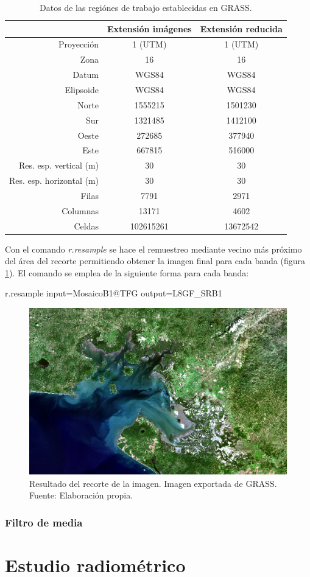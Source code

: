 \begin{table}[ht]
	\centering
	\caption[Datos de las regiónes de trabajo]{Datos de las regiónes de trabajo establecidas en GRASS.}
	\begin{tabular}{|r|c|c|}
	\hline
	& Extensión imágenes & Extensión reducida\\
	\hline
	Proyección & 1 (UTM) & 1 (UTM) \\
	\hline
	Zona & 16 & 16 \\
	\hline
	Datum & WGS84 & WGS84 \\
	\hline
	Elipsoide & WGS84 & WGS84 \\
	\hline
	Norte & 1555215 &1501230 \\
	\hline
	Sur & 1321485 & 1412100 \\
	\hline
	Oeste & 272685 & 377940 \\
	\hline
	Este & 667815 & 516000 \\
	\hline
	Res. esp. vertical (m) & 30 & 30 \\
	\hline
	Res. esp. horizontal (m) & 30 & 30\\
	\hline
	Filas & 7791 & 2971 \\
	\hline
	Columnas & 13171 & 4602 \\
	\hline
	Celdas & 102615261 & 13672542 \\
	\hline
	\end{tabular}
	\label{tab:region}
\end{table}

Con el comando \textit{r.resample} se hace el remuestreo mediante vecino más próximo del área del recorte permitiendo obtener la imagen final para cada banda (figura \ref{fig:recorte}). El comando se emplea de la siguiente forma para cada banda:

\begin{center}
\begin{boxedverbatim}
	r.resample input=MosaicoB1@TFG output=L8GF_SRB1
\end{boxedverbatim}
\end{center}

\begin{figure}
	\centering
	\includegraphics[width=0.8\linewidth]{./Imagenes/Recorte.eps}
	\caption[Recorte de imagen Landsat]{Resultado del recorte de la imagen. Imagen exportada de GRASS. Fuente: Elaboración propia.}
	\label{fig:recorte}
\end{figure}

\subsubsection{Filtro de media}

\section{Estudio radiométrico}
